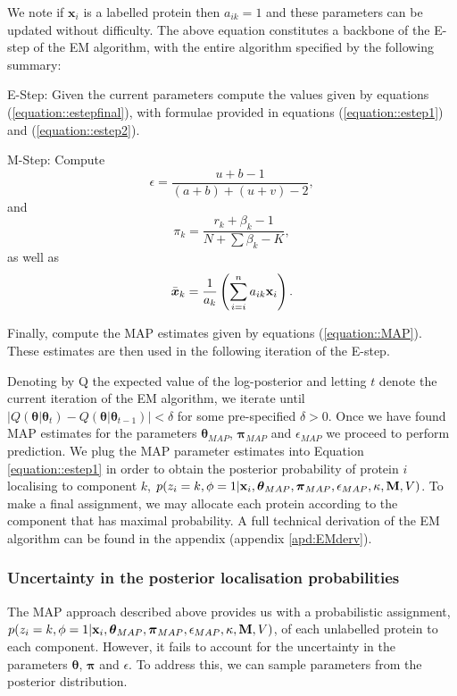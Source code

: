 \documentclass[12pt,english]{article}\usepackage[]{graphicx}\usepackage[]{color}
\begin{document}
We note if $\boldsymbol{x}_i$ is a labelled protein then $a_{ik} = 1$
and these parameters can be updated without difficulty.  The above
equation constitutes a backbone of the E-step of the EM algorithm, with
the entire algorithm specified by the following summary:


E-Step: Given the current parameters compute the values given by
equations (\ref{equation::estepfinal}), with formulae provided in
equations (\ref{equation::estep1}) and (\ref{equation::estep2}).

\bigskip

M-Step: Compute
\[\epsilon = \frac{ u + b - 1}{(a+b) + (u+v) - 2},\]
and
\[\pi_k = \frac{r_k + \beta_k - 1}{N + \sum \beta_k - K},\]
as well as
\[\bar{\boldsymbol{x}}_k = \frac{1}{a_k}\left(\sum_{i=i}^{n}a_{ik}{\bf x}_i\right).\]

Finally, compute the MAP estimates given by equations
(\ref{equation::MAP}). These estimates are then used in the following
iteration of the E-step.


Denoting by Q the expected value of the log-posterior and letting $t$
denote the current iteration of the EM algorithm, we iterate until
$\lvert Q(\boldsymbol{\theta}|\boldsymbol{\theta}_{t}) -
Q(\boldsymbol{\theta}|\boldsymbol{\theta}_{t-1})\rvert < \delta$ for
some pre-specified $\delta >0$.  Once we have found MAP estimates for
the parameters $\boldsymbol{\theta}_{MAP}$, $\boldsymbol{\pi}_{MAP}$
and $\epsilon_{MAP}$ we proceed to perform prediction. We plug the MAP
parameter estimates into Equation \eqref{equation::estep1} in order to
obtain the posterior probability of protein $i$ localising to
component $k$,
$p(z_i = k, \phi = 1 | {\bf x}_i, \boldsymbol{\theta}_{MAP},
\boldsymbol{\pi}_{MAP} , \epsilon_{MAP},\kappa, {\bf M}, V)$. To make
a final assignment, we may allocate each protein according to the
component that has maximal probability.  A full technical derivation
of the EM algorithm can be found in the appendix (appendix
\ref{apd:EMderv}).

\subsubsection{Uncertainty in the posterior localisation probabilities}\label{section::MCMC}

The MAP approach described above provides us with a probabilistic
assignment,
$p(z_i = k, \phi = 1 | {\bf x}_i, \boldsymbol{\theta}_{MAP},
\boldsymbol{\pi}_{MAP} , \epsilon_{MAP},\kappa, {\bf M}, V)$, of each
unlabelled protein to each component.  However, it fails to account
for the uncertainty in the parameters $\boldsymbol{\theta}$,
$\boldsymbol{\pi}$ and $\epsilon$. To address this, we can sample
parameters from the posterior distribution.
\end{document}
